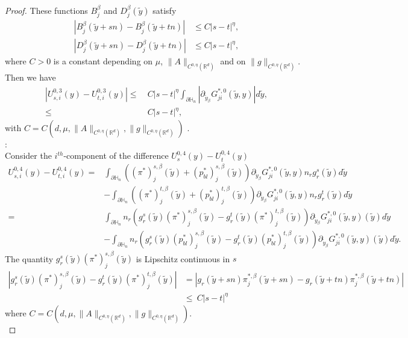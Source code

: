 \documentclass[10pt,a4paper]{amsart}
\begin{document}
\begin{proof}[Proof]
		\noindent	These functions  $B_j^{\beta}$ and   $D_j^{\beta}(\tilde{y})$   satisfy   
		\begin{align*}
			|B^{\beta}_{j}\left(\tilde{y}+sn \right) -B^{\beta}_{j}\left(\tilde{y}+tn \right)| &\leq C |s-t|^\eta , \\
			|D^{\beta}_{j}\left(\tilde{y}+sn \right) -D^{\beta}_{j}\left(\tilde{y}+tn \right)|&\leq  C  |s-t|^\eta ,
		\end{align*}
		where $C>0$ is a constant depending on $\mu$, $\|A\|_{C^{0,\eta}(\mathbb{R}^d)}$ and on  $\|g\|_{C^{0,\eta}(\mathbb{R}^d)}$. Then we have 
		\begin{align*}
			|U_{s,i}^{0,3}(y)- 	U_{t,i}^{0,3}(y)|
			\leq &\: C  |s-t|^\eta \int_{\partial\mathbb{H}_n} |\partial_{ \tilde{y}_\beta} G^{*,0}_{ji}(\tilde{y},y)| d\tilde{y},\\
			\leq &\: C  |s-t|^\eta ,
		\end{align*}
		with $C=C(d,\mu,\|A\|_{C^{0,\eta}(\mathbb{R}^d)},\|g\|_{C^{0,\eta}(\mathbb{R}^d)})$ .\\
		
		:\\
		Consider the $i^{th}$-component of the difference 	$U_{s}^{0,4}(y)-U_{t}^{0,4}(y)$
		\begin{align*}
			U_{s,i}^{0,4}(y)-U_{t,i}^{0,4}(y)=& \int_{\partial\mathbb{H}_n}\left( (\pi^{*})_{j}^{s,\beta}(\tilde{y})+(p_{bl}^{*})_{j}^{s,\beta}(\tilde{y}) \right) \partial_{\tilde{y}_\beta} G_{ji}^{*,0}(\tilde{y}, y) n_r  g^s_r(\tilde{y}) d\tilde{y} \\
			&  - \int_{\partial\mathbb{H}_n}    \left( (\pi^{*})_{j}^{t,\beta}(\tilde{y})+(p_{bl}^{*})_{j}^{t,\beta}(\tilde{y}) \right)  \partial_{\tilde{y}_\beta} G_{ji}^{*,0}(\tilde{y}, y) n_r  g^t_r(\tilde{y}) d\tilde{y} \\
			=& \int_{\partial\mathbb{H}_n}n_r \left( g^s_r (\tilde{y}) (\pi^{*})_{j}^{s,\beta}(\tilde{y})-g^t_r (\tilde{y}) (\pi^{*})_{j}^{t,\beta}(\tilde{y}) \right) \partial_{\tilde{y}_\beta} G_{ji}^{*,0}(\tilde{y}, y) (\tilde{y}) d\tilde{y} \\
			&  - \int_{\partial\mathbb{H}_n} n_r \left( g^s_r (\tilde{y}) (p_{bl}^{*})_{j}^{s,\beta}(\tilde{y})-g^t_r (\tilde{y}) (p_{bl}^{*})_{j}^{t,\beta}(\tilde{y}) \right) \partial_{\tilde{y}_\beta} G_{ji}^{*,0}(\tilde{y}, y) (\tilde{y})   d\tilde{y} .
		\end{align*}
		The quantity  $g^s_r (\tilde{y}) (\pi^{*})_{j}^{s,\beta}(\tilde{y})$  is Lipschitz continuous in $s$
		\begin{align*}
			|g^s_r (\tilde{y}) (\pi^{*})_{j}^{s,\beta}(\tilde{y})-g^t_r (\tilde{y}) (\pi^{*})_{j}^{t,\beta}(\tilde{y}) | &= |g_r (\tilde{y}+sn) \pi_{j}^{*,\beta}(\tilde{y}+sn )-g_r (\tilde{y}+tn) \pi_{j}^{*,\beta}(\tilde{y}+tn) | \\
			&\leq \: C |s-t|^\eta
		\end{align*}
	where 	$C=C(d,\mu,\|A\|_{C^{0,\eta}(\mathbb{R}^d)},\|g\|_{C^{0,\eta}(\mathbb{R}^d)}).$ \\
		

\end{proof}
\end{document}

